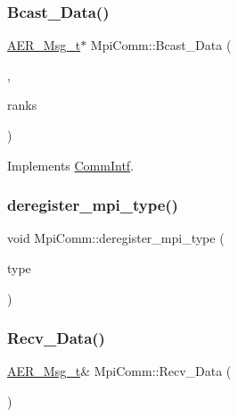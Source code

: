 \subsubsection{\texorpdfstring{Bcast\+\_\+\+Data()}{Bcast\_Data()}}
{\footnotesize\ttfamily \mbox{\hyperlink{structAER__Msg__t}{A\+E\+R\+\_\+\+Msg\+\_\+t}}$\ast$ Mpi\+Comm\+::\+Bcast\+\_\+\+Data (\begin{DoxyParamCaption}\item[{\mbox{\hyperlink{structAER__Msg__t}{A\+E\+R\+\_\+\+Msg\+\_\+t}} const \&}]{,  }\item[{std\+::vector$<$ int $>$}]{ranks }\end{DoxyParamCaption})\hspace{0.3cm}{\ttfamily [virtual]}}



Implements \mbox{\hyperlink{classCommIntf_a9ed907991869cc7b6ebac4688d085147}{Comm\+Intf}}.

\mbox{\label{classMpiComm_a1ed8ee3ad0b45b8120d1665f03d22566}} 
\subsubsection{\texorpdfstring{deregister\+\_\+mpi\+\_\+type()}{deregister\_mpi\_type()}}
{\footnotesize\ttfamily void Mpi\+Comm\+::deregister\+\_\+mpi\+\_\+type (\begin{DoxyParamCaption}\item[{M\+P\+I\+\_\+\+Datatype}]{type }\end{DoxyParamCaption})\hspace{0.3cm}{\ttfamily [private]}}

\mbox{\label{classMpiComm_a9ff0e7421ac75131c2ce4f0bba8c2839}} 
\subsubsection{\texorpdfstring{Recv\+\_\+\+Data()}{Recv\_Data()}}
{\footnotesize\ttfamily \mbox{\hyperlink{structAER__Msg__t}{A\+E\+R\+\_\+\+Msg\+\_\+t}}\& Mpi\+Comm\+::\+Recv\+\_\+\+Data (\begin{DoxyParamCaption}{ }\end{DoxyParamCaption})\hspace{0.3cm}{\ttfamily [virtual]}}




